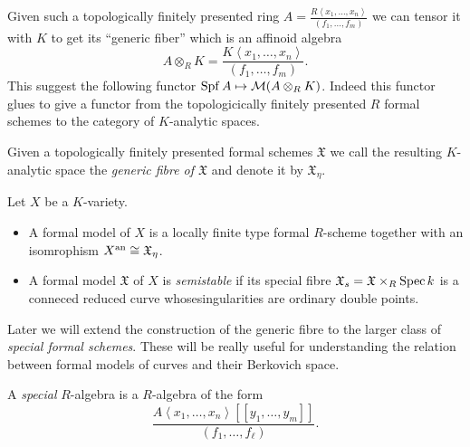 Given such a topologically finitely presented ring $A = \frac{R \left<x_1, \ldots, x_n \right>}{(f_1, \ldots, f_m)}$ we can tensor it with $K$ to get its ``generic fiber'' which is an affinoid algebra \[
A \otimes _R K = \frac{K \left<x_1, \ldots, x_n \right>}{(f_1, \ldots, f_m)}
.\]  
This suggest the following functor $\operatorname{Spf} A \mapsto \mathcal{M} (A \otimes_R K)$. 
Indeed this functor glues to give a functor from the topologicically finitely presented $R$ formal schemes to the category of $K$-analytic spaces. 

\begin{definition}\label{def:generic_fibre_of_formal_scheme}
Given a topologically finitely presented formal schemes $\mathfrak{X} $ we call the resulting $K$-analytic space the \emph{generic fibre of  $\mathfrak{X} $} and denote it by $\mathfrak{X} _\eta$. 
\end{definition}

\begin{definition}
	Let $X$ be a $K$-variety. 
	\begin{itemize}
		\item A formal model of $X$ is a locally finite type formal $R$-scheme together with an isomrophism $X{}^{\text{an}} \cong \mathfrak{X}_{\eta}$.
		\item A formal model $\mathfrak{X}  $ of $X$ is \emph{semistable} if its special fibre $\mathfrak{X} _s = \mathfrak{X} \times_R \operatorname{Spec} k$ is a conneced reduced curve whosesingularities are ordinary double points. 
	\end{itemize}
\end{definition}

Later we will extend the construction of the generic fibre to the larger class of \emph{special formal schemes}.
These will be really useful for understanding the relation between formal models of curves and their Berkovich space. 
\begin{definition}\label{def:special_r_algebra}
	A \emph{special} $R$-algebra is a $R$-algebra of the form \[
		\frac{A\left<x_1, \ldots, x_n \right>[[y_1, \ldots, y_m]]}{(f_1, \ldots, f_\ell)}
	.\] 
\end{definition}





